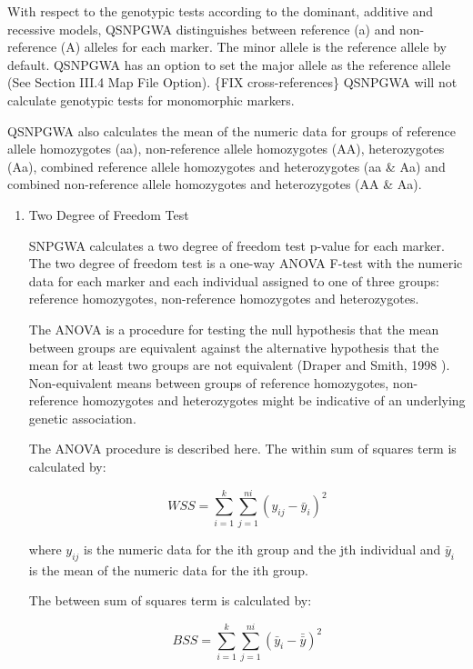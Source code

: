 With respect to the genotypic tests according to the dominant, additive and
recessive models, QSNPGWA distinguishes between reference (a) and non-reference
(A) alleles for each marker.  The minor allele is the reference allele by
default.  QSNPGWA has an option to set the major allele as the reference allele
(See Section III.4 Map File Option). \{FIX cross-references\} QSNPGWA will not
calculate genotypic tests for monomorphic markers.

QSNPGWA also calculates the mean of the numeric data for groups of reference
allele homozygotes (aa), non-reference allele homozygotes (AA), heterozygotes
(Aa), combined reference allele homozygotes and heterozygotes (aa \& Aa) and
combined non-reference allele homozygotes and heterozygotes (AA \& Aa).

\begin{enumerate}

\item{Two Degree of Freedom Test}


  SNPGWA calculates a two degree of freedom test p-value for each marker.  The
  two degree of freedom test is a one-way ANOVA F-test with the numeric data for
  each marker and each individual assigned to one of three groups: reference
  homozygotes, non-reference homozygotes and heterozygotes.

  The ANOVA is a procedure for testing the null hypothesis that the mean between
  groups are equivalent against the alternative hypothesis that the mean for at
  least two groups are not equivalent (Draper and Smith, 1998 \cite{Draper98}).
  Non-equivalent means between groups of reference homozygotes, non-reference
  homozygotes and heterozygotes might be indicative of an underlying genetic
  association.

  The ANOVA procedure is described here.  The within sum of squares term is
  calculated by:

  \begin{equation*}
    WSS = \sum^k_{i=1}\sum^{n{i}}_{j=1}\left(y_{ij} - \bar{y}_i\right)^2
  \end{equation*}

  where $y_{ij}$ is the numeric data for the ith group and the jth individual
  and $\bar{y}_i$ is the mean of the numeric data for the ith group.

  The between sum of squares term is calculated by:

  \begin{equation*}
    BSS = \sum^k_{i=1}\sum^{n{i}}_{j=1}\left(\bar{y}_i - \bar{\bar{y}}\right)^2    
  \end{equation*}


\end{enumerate}
